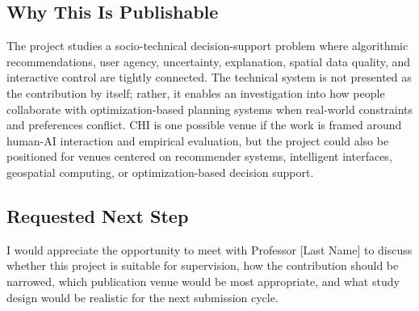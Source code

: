 \documentclass[11pt,a4paper]{article}
\begin{document}
\subsection*{Why This Is Publishable}

\noindent The project studies a socio-technical decision-support problem where algorithmic recommendations, user agency, uncertainty, explanation, spatial data quality, and interactive control are tightly connected. The technical system is not presented as the contribution by itself; rather, it enables an investigation into how people collaborate with optimization-based planning systems when real-world constraints and preferences conflict. CHI is one possible venue if the work is framed around human-AI interaction and empirical evaluation, but the project could also be positioned for venues centered on recommender systems, intelligent interfaces, geospatial computing, or optimization-based decision support.

\subsection*{Requested Next Step}

\noindent I would appreciate the opportunity to meet with Professor [Last Name] to discuss whether this project is suitable for supervision, how the contribution should be narrowed, which publication venue would be most appropriate, and what study design would be realistic for the next submission cycle.
\end{document}
